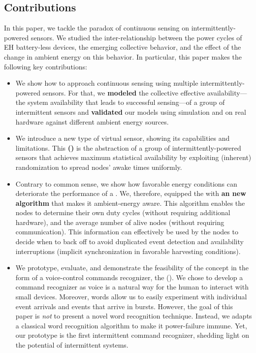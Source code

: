 \subsection{Contributions}
In this paper, we tackle the paradox of continuous sensing on intermittently-powered sensors. 
We studied the inter-relationship between the power cycles of EH battery-less devices, the emerging collective behavior, and the effect of the change in ambient energy on this behavior. In particular, this paper makes the following key contributions:
\begin{itemize}[leftmargin=*]
%
\item We show how to approach continuous sensing using multiple intermittently-powered sensors. 
For that, we \textbf{modeled} the collective effective availability---the system availability that leads to successful sensing---of a group of intermittent sensors and \textbf{validated} our models using simulation and on real hardware against different ambient energy sources. 
%
\item We introduce a new type of virtual sensor, showing its capabilities and limitations. This \textbf{\fullcis (\cis)} is the abstraction of a group of intermittently-powered sensors that achieves maximum statistical availability by exploiting (inherent) randomization to spread nodes' awake times uniformly.
% 
\item Contrary to common sense, we show how favorable energy conditions can deteriorate the performance of a \cis. We, therefore, equipped the \cis with \textbf{an new algorithm} that makes it ambient-energy aware. This algorithm enables the nodes to determine their own duty cycles (without requiring additional hardware), and the average number of alive nodes (without requiring communication). This information can effectively be used by the nodes to decide when to back off to avoid duplicated event detection and availability interruptions (implicit synchronization in favorable harvesting conditions).
%
\item We prototype, evaluate, and demonstrate the feasibility of the \fullcis concept in the form of a voice-control commands recognizer, the \textbf{\fullCIM} (\textbf{\cim}). 
We chose to develop a command recognizer as 
voice is a natural way for the human to interact with small devices. Moreover, words allow us to easily experiment with individual event arrivals and events that arrive in bursts. 
However, the goal of this paper is \emph{not} to present a novel word recognition technique. 
Instead, we adapts a classical word recognition algorithm to make it power-failure immune. Yet, our \cim prototype is the first intermittent command recognizer, shedding light on the potential of intermittent systems. 

\end{itemize}





















